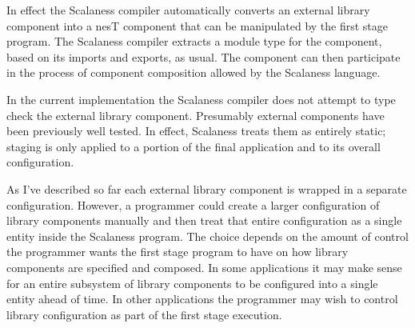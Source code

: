 In effect the Scalaness compiler automatically converts an external library component into a
nesT component that can be manipulated by the first stage program. The Scalaness compiler
extracts a module type for the component, based on its imports and exports, as usual. The
component can then participate in the process of component composition allowed by the Scalaness
language.

In the current implementation the Scalaness compiler does not attempt to type check the external
library component. Presumably external components have been previously well tested. In effect,
Scalaness treats them as entirely static; staging is only applied to a portion of the final
application and to its overall configuration.


As I've described so far each external library component is wrapped in a separate configuration.
However, a programmer could create a larger configuration of library components manually and
then treat that entire configuration as a single entity inside the Scalaness program. The choice
depends on the amount of control the programmer wants the first stage program to have on how
library components are specified and composed. In some applications it may make sense for an
entire subsystem of library components to be configured into a single entity ahead of time. In
other applications the programmer may wish to control library configuration as part of the first
stage execution.
